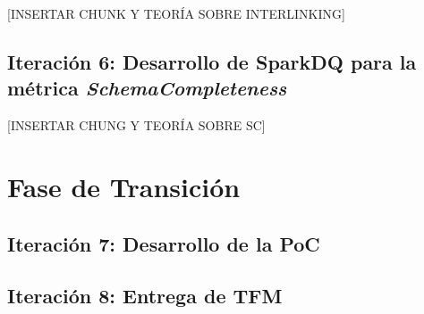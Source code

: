 [INSERTAR CHUNK Y TEORÍA SOBRE INTERLINKING]

\subsection{Iteración 6: Desarrollo de SparkDQ para la métrica \textit{SchemaCompleteness}}



[INSERTAR CHUNG Y TEORÍA SOBRE SC]

\section{Fase de Transición}

\subsection{Iteración 7: Desarrollo de la PoC}



\subsection{Iteración 8: Entrega de TFM}


